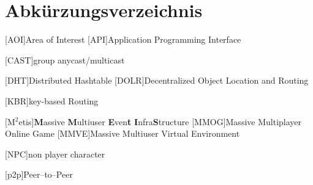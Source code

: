 \chapter*{Abkürzungsverzeichnis}

\pagestyle{useheadings}

\vspace{\topskip}


\begin{acronym}[xxxxxxxxxxxx]
	\setlength{\itemsep}{-\parsep}
	\setlength{\itemindent}{1.5em}
	[AOI]{Area of Interest}
	[API]{Application Programming Interface}

 [CAST]{group anycast/multicast}

	 [DHT]{Distributed Hashtable}
	[DOLR]{Decentralized Object Location and Routing}



	
	
[KBR]{key-based Routing}




	[M$^2$etis]{\textbf{M}assive \textbf{M}ultiuser \textbf{E}ven\textbf{t} \textbf{I}nfra\textbf{S}tructure}	
	[MMOG]{Massive Multiplayer Online Game}
	[MMVE]{Massive Multiuser Virtual Environment}

	[NPC]{non player character}


	
	[p2p]{Peer--to--Peer}

	


\end{acronym}
